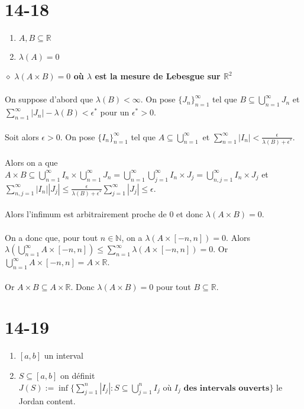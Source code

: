 \documentclass[a4paper,10pt]{article}
\begin{document}
\section*{14-18}
\begin{enumerate}
	\item $A,B \subseteq \mathbb{R}$
	\item $\lambda (A) = 0$
\end{enumerate}
$\diamond$ \textbf{$\lambda( A \times B) = 0$ où $\lambda$ est la mesure de Lebesgue sur $\mathbb{R}^2$}
\\
\\
On suppose d'abord que $\lambda (B) < \infty$. On pose $\{J_n\}_{n=1}^\infty$ tel que $B \subseteq \bigcup_{n=1}^\infty J_n$ et $\sum_{n=1}^\infty |J_n| - \lambda (B) < \epsilon^*$ pour un $\epsilon^* > 0$.
\\
\\
Soit alors $\epsilon > 0$. On pose $\{I_n\}_{n=1}^\infty$ tel que $A \subseteq \bigcup_{n=1}^\infty$ et $\sum_{n=1}^\infty |I_n| < \frac{\epsilon}{\lambda(B) + \epsilon^*}$.
\\
\\
Alors on a que $A \times B \subseteq \bigcup_{n=1}^\infty I_n \times \bigcup_{n=1}^\infty J_n = \bigcup_{n=1}^\infty \bigcup_{j=1}^\infty I_n \times J_j = \bigcup_{n,j = 1}^\infty I_n \times J_j$ et $\sum_{n,j=1}^\infty |I_n| |J_j| \leq \frac{\epsilon}{\lambda (B) + \epsilon^*} \sum_{j=1}^\infty |J_j| \leq \epsilon $.
\\
\\
Alors l'infimum est arbitrairement proche de 0 et donc $\lambda (A \times B) = 0$.
\\
\\
On a donc que, pour tout $n \in \mathbb{N}$, on a $\lambda (A \times [-n, n]) = 0$. Alors $\lambda (\bigcup_{n=1}^\infty A \times [-n,n]) \leq \sum_{n=1}^\infty \lambda (A \times [-n,n]) = 0$. Or $\bigcup_{n=1}^\infty A \times [-n,n] = A \times \mathbb{R}$.
\\
\\
Or $A \times B \subseteq A \times \mathbb{R}$. Donc $\lambda (A \times B) = 0$ pour tout $B \subseteq \mathbb{R}$.

\section*{14-19}
\begin{enumerate}
	\item $[a,b]$ un interval
	\item $S \subseteq [a,b]$ on définit $J(S) := \inf \{\sum_{j=1}^n |I_j| : S \subseteq \bigcup_{j=1}^n I_j \text{ où } I_j \textbf{ des intervals ouverts} \}$ le Jordan content.
\end{enumerate}
\end{document}

